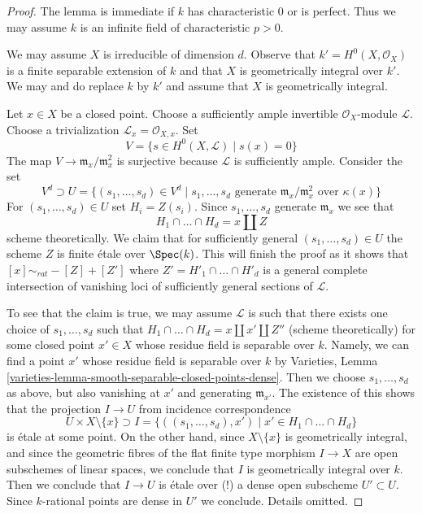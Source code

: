 \begin{proof}
The lemma is immediate if $k$ has characteristic $0$ or is perfect.
Thus we may assume $k$ is an infinite field of characteristic $p > 0$.

\medskip\noindent
We may assume $X$ is irreducible of dimension $d$.
Observe that $k' = H^0(X, \mathcal{O}_X)$ is a finite separable
extension of $k$ and that $X$ is geometrically integral over $k'$.
We may and do replace $k$ by $k'$ and assume that $X$ is
geometrically integral.

\medskip\noindent
Let $x \in X$ be a closed point. Choose a sufficiently ample invertible
$\mathcal{O}_X$-module $\mathcal{L}$. Choose a trivialization
$\mathcal{L}_x = \mathcal{O}_{X, x}$. Set
$$
V = \{s \in H^0(X, \mathcal{L}) \mid s(x) = 0 \}
$$
The map $V \to \mathfrak m_x/\mathfrak m_x^2$ is surjective because
$\mathcal{L}$ is sufficiently ample. Consider the set
$$
V^d \supset U =
\{
(s_1, \ldots, s_d) \in V^d \mid s_1, \ldots, s_d
\text{ generate }
\mathfrak m_x/\mathfrak m_x^2
\text{ over }\kappa(x)
\}
$$
For $(s_1, \ldots, s_d) \in U$ set $H_i = Z(s_i)$. Since
$s_1, \ldots, s_d$ generate $\mathfrak m_x$ we see that
$$
H_1 \cap \ldots \cap H_d = x \amalg Z
$$
scheme theoretically.
We claim that for sufficiently general $(s_1, \ldots, s_d) \in U$
the scheme $Z$ is finite \'etale over $\Spec(k)$. This will finish
the proof as it shows that $[x] \sim_{rat} - [Z] + [Z']$
where $Z' = H'_1 \cap \ldots \cap H'_d$ is a general complete
intersection of vanishing loci of sufficiently general sections
of $\mathcal{L}$.

\medskip\noindent
To see that the claim is true, we may assume $\mathcal{L}$ is such that
there exists one choice of $s_1, \ldots, s_d$ such that
$H_1 \cap \ldots \cap H_d = x \amalg x' \amalg Z''$ (scheme theoretically)
for some closed point $x' \in X$ whose residue field is separable over $k$.
Namely, we can find a point $x'$ whose residue field is separable over
$k$ by
Varieties, Lemma \ref{varieties-lemma-smooth-separable-closed-points-dense}.
Then we choose $s_1, \ldots, s_d$ as above, but also vanishing at
$x'$ and generating $\mathfrak m_{x'}$.
The existence of this shows that the projection $I \to U$ from
incidence correspondence
$$
U \times X \setminus \{x\} \supset
I = \{((s_1, \ldots, s_d), x') \mid x' \in H_1 \cap \ldots \cap H_d\}
$$
is \'etale at some point. On the other hand, since $X \setminus \{x\}$
is geometrically integral, and since the geometric fibres of
the flat finite type morphism
$I \to X$ are open subschemes of linear spaces, we conclude that 
$I$ is geometrically integral over $k$.
Then we conclude that $I \to U$ is \'etale over (!)
a dense open subscheme $U' \subset U$. Since $k$-rational
points are dense in $U'$ we conclude.
Details omitted.
\end{proof}

